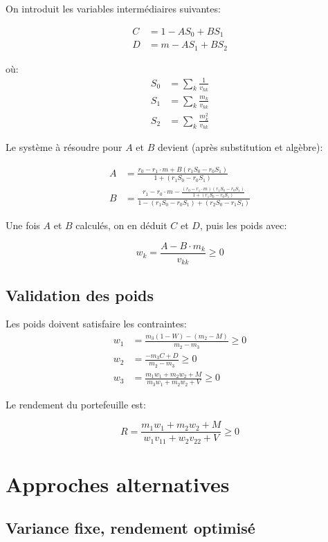 \documentclass[11pt,a4paper]{article}
\begin{document}
On introduit les variables intermédiaires suivantes:

\begin{align}
C &= 1 - A S_0 + B S_1 \\
D &= m - A S_1 + B S_2
\end{align}

où:
\begin{align}
S_0 &= \sum_k \frac{1}{v_{kk}} \\
S_1 &= \sum_k \frac{m_k}{v_{kk}} \\
S_2 &= \sum_k \frac{m_k^2}{v_{kk}}
\end{align}

Le système à résoudre pour $A$ et $B$ devient (après substitution et algèbre):

\begin{align}
A &= \frac{r_0 - r_1 \cdot m + B(r_1 S_0 - r_0 S_1)}{1 + (r_1 S_0 - r_0 S_1)} \\
B &= \frac{r_1 - r_0 \cdot m - \frac{(r_0 - r_1 \cdot m)(r_1 S_0 - r_0 S_1)}{1 + (r_1 S_0 - r_0 S_1)}}{1 - (r_1 S_0 - r_0 S_1) + (r_2 S_0 - r_1 S_1)}
\end{align}

Une fois $A$ et $B$ calculés, on en déduit $C$ et $D$, puis les poids avec:

\[
w_k = \frac{A - B \cdot m_k}{v_{kk}} \geq 0
\]

\subsection{Validation des poids}

Les poids doivent satisfaire les contraintes:
\begin{align}
w_1 &= \frac{m_3(1-W) - (m_2 - M)}{m_2 - m_3} \geq 0 \\
w_2 &= \frac{-m_3 C + D}{m_2 - m_3} \geq 0 \\
w_3 &= \frac{m_1 w_1 + m_2 w_2 + M}{m_3 w_1 + m_2 w_2 + V} \geq 0
\end{align}

Le rendement du portefeuille est:

\[
R = \frac{m_1 w_1 + m_2 w_2 + M}{w_1 v_{11} + w_2 v_{22} + V} \geq 0
\]

\section{Approches alternatives}

\subsection{Variance fixe, rendement optimisé}
\end{document}
